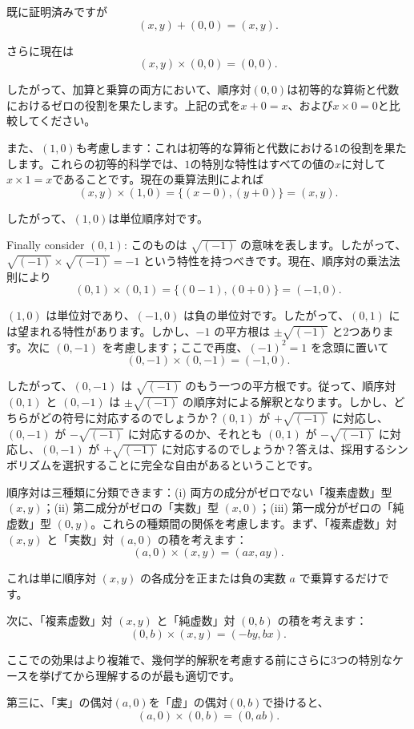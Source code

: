 \documentclass[a4paper,11pt,openany]{ltjsbook}
\begin{document}
既に証明済みですが
\[
(x, y) + (0, 0) = (x, y).
\]

さらに現在は
\[
(x, y) × (0, 0) = (0, 0).
\]

したがって、加算と乗算の両方において、順序対$(0, 0)$は初等的な算術と代数におけるゼロの役割を果たします。上記の式を$x + 0 = x$、および$x × 0 = 0$と比較してください。

また、$(1, 0)$も考慮します：これは初等的な算術と代数における$1$の役割を果たします。これらの初等的科学では、$1$の特別な特性はすべての値の$x$に対して$x × 1 = x$であることです。現在の乗算法則によれば
\[
(x, y) × (1, 0) = \{(x - 0), (y + 0)\} = (x, y).
\]

したがって、$(1, 0)$は単位順序対です。

Finally consider $(0, 1)$: このものは $\sqrt{(-1)}$ の意味を表します。したがって、$\sqrt{(-1)} × \sqrt{(-1)} = -1$ という特性を持つべきです。現在、順序対の乗法法則により
\[
(0, 1) × (0, 1) = \{(0 - 1), (0 + 0)\} = (-1, 0).
\]

$(1, 0)$ は単位対であり、$(-1, 0)$ は負の単位対です。したがって、$(0, 1)$ には望まれる特性があります。しかし、$-1$ の平方根は $±\sqrt{(-1)}$ と2つあります。次に $(0, -1)$ を考慮します；ここで再度、$(-1)^2 = 1$ を念頭に置いて
\[
(0, -1) × (0, -1) = (-1, 0).
\]

したがって、$(0, -1)$ は $\sqrt{(-1)}$ のもう一つの平方根です。従って、順序対 $(0, 1)$ と $(0, -1)$ は $±\sqrt{(-1)}$ の順序対による解釈となります。しかし、どちらがどの符号に対応するのでしょうか？$(0, 1)$ が $+\sqrt{(-1)}$ に対応し、$(0, -1)$ が $-\sqrt{(-1)}$ に対応するのか、それとも $(0, 1)$ が $-\sqrt{(-1)}$ に対応し、$(0, -1)$ が $+\sqrt{(-1)}$ に対応するのでしょうか？答えは、採用するシンボリズムを選択することに完全な自由があるということです。

順序対は三種類に分類できます：(i) 両方の成分がゼロでない「複素虚数」型 $(x, y)$；(ii) 第二成分がゼロの「実数」型 $(x, 0)$；(iii) 第一成分がゼロの「純虚数」型 $(0, y)$。これらの種類間の関係を考慮します。まず、「複素虚数」対 $(x, y)$ と「実数」対 $(a, 0)$ の積を考えます：
\[
(a, 0) × (x, y) = (ax, ay).
\]

これは単に順序対 $(x, y)$ の各成分を正または負の実数 $a$ で乗算するだけです。

次に、「複素虚数」対 $(x, y)$ と「純虚数」対 $(0, b)$ の積を考えます：
\[
(0, b) × (x, y) = (-by, bx).
\]

ここでの効果はより複雑で、幾何学的解釈を考慮する前にさらに3つの特別なケースを挙げてから理解するのが最も適切です。

第三に、「実」の偶対$(a, 0)$を「虚」の偶対$(0, b)$で掛けると、
\[
(a, 0) × (0, b) = (0, ab).
\]
\end{document}
